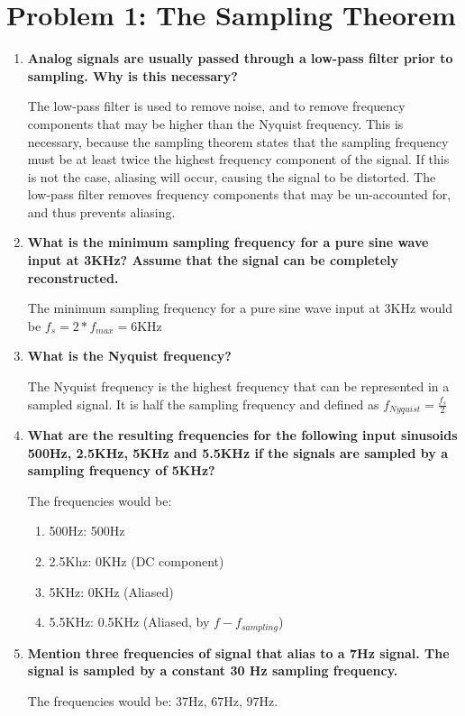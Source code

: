\section{Problem 1: The Sampling Theorem}
\begin{enumerate}
    \item {\bf Analog signals are usually passed through a low-pass filter prior to sampling. Why is this necessary?}

          The low-pass filter is used to remove noise, and to remove frequency components that may be higher than the Nyquist frequency. This is necessary, because the sampling theorem states that the sampling frequency must be at least twice the highest frequency component of the signal. If this is not the case, aliasing will occur, causing the signal to be distorted. The low-pass filter removes frequency components that may be un-accounted for, and thus prevents aliasing.

    \item {\bf What is the minimum sampling frequency for a pure sine wave input at 3KHz? Assume that the signal can be completely reconstructed.}

          The minimum sampling frequency for a pure sine wave input at 3KHz would be $f_s = 2 * f_{max} = 6\text{KHz}$

    \item {\bf What is the Nyquist frequency?}

          The Nyquist frequency is the highest frequency that can be represented in a sampled signal. It is half the sampling frequency and defined as $f_{Nyquist} = \frac{f_s}{2}$

    \item {\bf What are the resulting frequencies for the following input sinusoids 500Hz, 2.5KHz, 5KHz and 5.5KHz if the signals are sampled by a sampling frequency of 5KHz?}

          The frequencies would be:
          \begin{enumerate}
              \item 500Hz: 500Hz
              \item 2.5Khz: 0KHz (DC component)
              \item 5KHz: 0KHz (Aliased)
              \item 5.5KHz: 0.5KHz (Aliased, by $f - f_{sampling}$)
          \end{enumerate}

    \item {\bf Mention three frequencies of signal that alias to a 7Hz signal. The signal is sampled by a constant 30 Hz sampling frequency.}

          The frequencies would be: $37$Hz, $67$Hz, $97$Hz.
\end{enumerate}